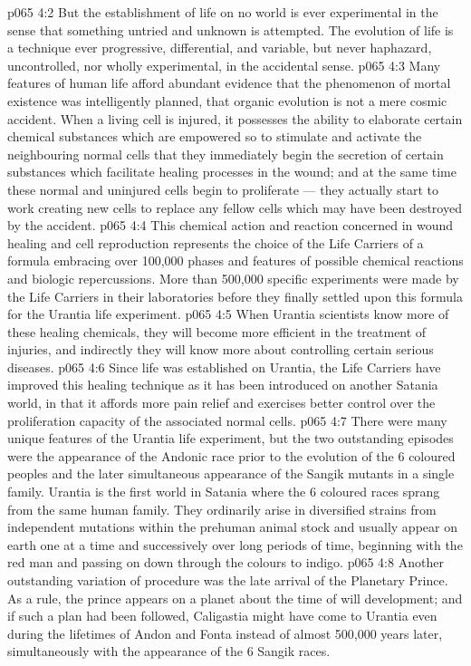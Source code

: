 \vs p065 4:2 But the establishment of life on no world is ever experimental in the sense that something untried and unknown is attempted. The evolution of life is a technique ever progressive, differential, and variable, but never haphazard, uncontrolled, nor wholly experimental, in the accidental sense.
\vs p065 4:3 \pc Many features of human life afford abundant evidence that the phenomenon of mortal existence was intelligently planned, that organic evolution is not a mere cosmic accident. When a living cell is injured, it possesses the ability to elaborate certain chemical substances which are empowered so to stimulate and activate the neighbouring normal cells that they immediately begin the secretion of certain substances which facilitate healing processes in the wound; and at the same time these normal and uninjured cells begin to proliferate --- they actually start to work creating new cells to replace any fellow cells which may have been destroyed by the accident.
\vs p065 4:4 This chemical action and reaction concerned in wound healing and cell reproduction represents the choice of the Life Carriers of a formula embracing over 100,000 phases and features of possible chemical reactions and biologic repercussions. More than 500,000 specific experiments were made by the Life Carriers in their laboratories before they finally settled upon this formula for the Urantia life experiment.
\vs p065 4:5 When Urantia scientists know more of these healing chemicals, they will become more efficient in the treatment of injuries, and indirectly they will know more about controlling certain serious diseases.
\vs p065 4:6 Since life was established on Urantia, the Life Carriers have improved this healing technique as it has been introduced on another Satania world, in that it affords more pain relief and exercises better control over the proliferation capacity of the associated normal cells.
\vs p065 4:7 \pc There were many unique features of the Urantia life experiment, but the two outstanding episodes were the appearance of the Andonic race prior to the evolution of the 6 coloured peoples and the later simultaneous appearance of the Sangik mutants in a single family. Urantia is the first world in Satania where the 6 coloured races sprang from the same human family. They ordinarily arise in diversified strains from independent mutations within the prehuman animal stock and usually appear on earth one at a time and successively over long periods of time, beginning with the red man and passing on down through the colours to indigo.
\vs p065 4:8 Another outstanding variation of procedure was the late arrival of the Planetary Prince. As a rule, the prince appears on a planet about the time of will development; and if such a plan had been followed, Caligastia might have come to Urantia even during the lifetimes of Andon and Fonta instead of almost 500,000 years later, simultaneously with the appearance of the 6 Sangik races.
